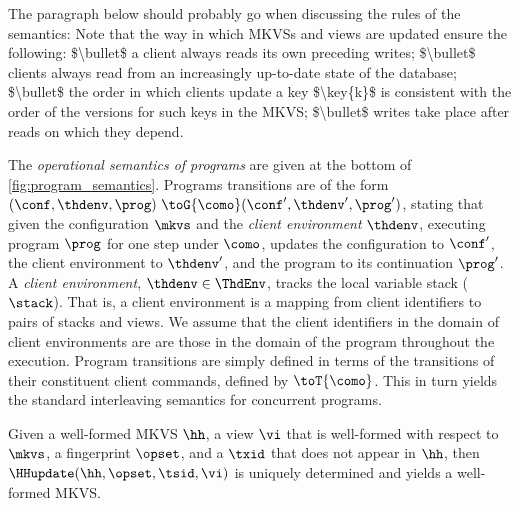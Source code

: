 \ac{The paragraph below should probably go when discussing the rules of the semantics:

Note that the way in which MKVSs and views are updated ensure the following: 
$\bullet$ a client always reads its own preceding writes; 
$\bullet$ clients always read from an increasingly up-to-date state of the database; 
$\bullet$ the order in which clients update a key $\key{k}$ is consistent with the 
order of the versions for such keys in the MKVS; 
$\bullet$ writes take place after reads on which they depend. 
}



The \emph{operational semantics of programs} are given at the bottom of \cref{fig:program_semantics}. 
Programs transitions are of the form $(\conf,  \thdenv, \prog) \ \toG{\como} (\conf',  \thdenv', \prog')$,
stating that given the configuration $\mkvs$ and the \emph{client environment} $\thdenv$, executing program $\prog$ for one step under $\como$, updates the configuration to $\conf'$, the client environment to $\thdenv'$, and the program to its continuation $\prog'$. 
A \emph{client environment}, $\thdenv \in \ThdEnv$, tracks the local variable stack ($\stack$). 
That is, a client environment is a mapping from client identifiers to pairs of stacks and views. 
We assume that the client identifiers in the domain of client environments are are those in the domain of the program throughout the execution. 
Program transitions are simply defined in terms of the transitions of their constituent client commands, defined by $\toT{\como}$. 
This in turn yields the standard interleaving semantics for concurrent programs. 




\begin{lemma}
\label{lem:hhupdate.welldefined}
Given a well-formed MKVS $\hh$, a view $\vi$ that is well-formed with respect to \( \mkvs \), a fingerprint \( \opset \), and a $\txid$ that does not appear in $\hh$, then $\HHupdate(\hh, \opset, \tsid, \vi)$ is uniquely determined and yields a well-formed MKVS.
\end{lemma}

